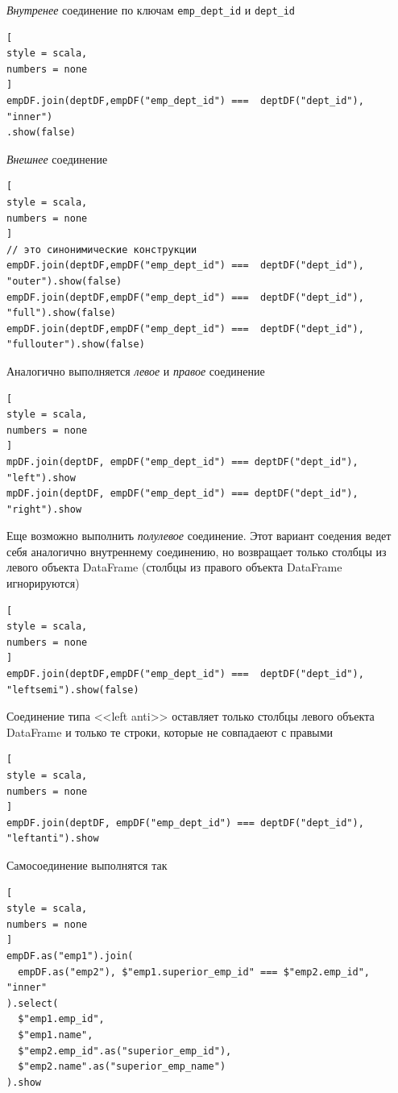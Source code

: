 \documentclass[%
	11pt,
	a4paper,
	utf8,
		]{article}
\begin{document}
\emph{Внутренее} соединение по ключам \verb|emp_dept_id| и \verb|dept_id|
\begin{lstlisting}[
style = scala,
numbers = none	
]
empDF.join(deptDF,empDF("emp_dept_id") ===  deptDF("dept_id"), "inner")
.show(false)
\end{lstlisting}

\emph{Внешнее} соединение
\begin{lstlisting}[
style = scala,
numbers = none	
]
// это синонимические конструкции
empDF.join(deptDF,empDF("emp_dept_id") ===  deptDF("dept_id"), "outer").show(false)
empDF.join(deptDF,empDF("emp_dept_id") ===  deptDF("dept_id"), "full").show(false)
empDF.join(deptDF,empDF("emp_dept_id") ===  deptDF("dept_id"), "fullouter").show(false)
\end{lstlisting}

Аналогично выполняется \emph{левое} и \emph{правое} соединение
\begin{lstlisting}[
style = scala,
numbers = none	
]
mpDF.join(deptDF, empDF("emp_dept_id") === deptDF("dept_id"), "left").show
mpDF.join(deptDF, empDF("emp_dept_id") === deptDF("dept_id"), "right").show
\end{lstlisting}

Еще возможно выполнить \emph{полулевое} соединение. Этот вариант соедения ведет себя аналогично внутреннему соединению, но возвращает только столбцы из левого объекта DataFrame (столбцы из правого объекта DataFrame игнорируются)
\begin{lstlisting}[
style = scala,
numbers = none	
]
empDF.join(deptDF,empDF("emp_dept_id") ===  deptDF("dept_id"), "leftsemi").show(false)
\end{lstlisting}

Соединение типа <<left anti>> оставляет только столбцы левого объекта DataFrame и только те строки, которые не совпадаеют с правыми
\begin{lstlisting}[
style = scala,
numbers = none	
]
empDF.join(deptDF, empDF("emp_dept_id") === deptDF("dept_id"), "leftanti").show
\end{lstlisting}

Самосоединение выполнятся так
\begin{lstlisting}[
style = scala,
numbers = none	
]
empDF.as("emp1").join(
  empDF.as("emp2"), $"emp1.superior_emp_id" === $"emp2.emp_id", "inner"
).select(
  $"emp1.emp_id",
  $"emp1.name",
  $"emp2.emp_id".as("superior_emp_id"),
  $"emp2.name".as("superior_emp_name")
).show
\end{lstlisting}
\end{document}
